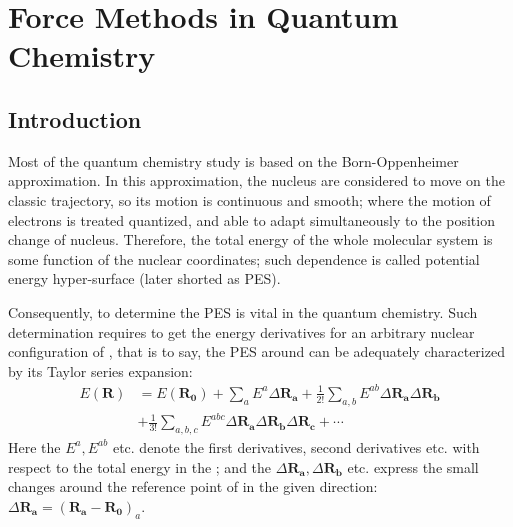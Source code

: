%
%
%
%
%

\chapter{Force Methods in Quantum Chemistry}\label{PULAY:1}
%
%
%
\section{Introduction}
%
%
%
Most of the quantum chemistry study is based on the Born-Oppenheimer
approximation. In this approximation, the nucleus are considered to
move on the classic trajectory, so its motion is continuous and
smooth; where the motion of electrons is treated quantized, and able
to adapt simultaneously to the position change of nucleus.  Therefore,
the total energy of the whole molecular system is some function of the
nuclear coordinates; such dependence is called potential energy
hyper-surface (later shorted as PES).

Consequently, to determine the PES is vital in the quantum
chemistry. Such determination requires to get the energy derivatives
for an arbitrary nuclear configuration of , that is to
say, the PES around  can be adequately characterized by
its Taylor series expansion:
\begin{equation}\label{PULAYeq:1}
  \begin{split}
    E(\mathbf{R}) &= E(\mathbf{R_{0}}) +
    \sum_{a}E^{a}\Delta\mathbf{R_{a}}
    +  \frac{1}{2!}\sum_{a,b}E^{ab}\Delta\mathbf{R_{a}}\Delta\mathbf{R_{b}} \\
    & +
    \frac{1}{3!}\sum_{a,b,c}E^{abc}\Delta\mathbf{R_{a}}\Delta\mathbf{R_{b}}
    \Delta\mathbf{R_{c}} + \cdots
  \end{split}
\end{equation}
Here the $E^{a}, E^{ab}$ etc. denote the first derivatives, second
derivatives etc. with respect to the total energy in the ;
and the $\Delta\mathbf{R_{a}}, \Delta\mathbf{R_{b}}$ etc. express the
small changes around the reference point of  in the given
direction: $\Delta\mathbf{R_{a}} =
(\mathbf{R_{a}}-\mathbf{R_{0}})_{a}$.

